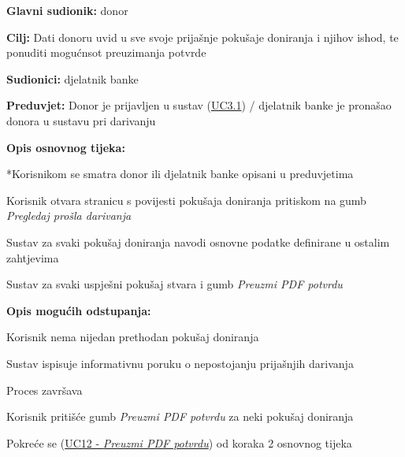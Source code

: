 					
					\noindent {}
					\begin{packed_item} \label{UC11}
	
						\item \textbf{Glavni sudionik: }donor
						\item  \textbf{Cilj:} Dati donoru uvid u sve svoje prijašnje pokušaje doniranja i njihov ishod, te ponuditi mogućnsot preuzimanja potvrde
						\item  \textbf{Sudionici:} djelatnik banke
						\item  \textbf{Preduvjet:} Donor je prijavljen u sustav (\hyperref[UC3.1]{UC3.1}) / djelatnik banke je pronašao donora u sustavu pri darivanju
						\item  \textbf{Opis osnovnog tijeka:}
						
						*Korisnikom se smatra donor ili djelatnik banke opisani u preduvjetima
						\item[] \begin{packed_enum}
							\item Korisnik otvara stranicu s povijesti pokušaja doniranja pritiskom na gumb \textit{Pregledaj prošla darivanja}
	                        \item Sustav za svaki pokušaj doniranja navodi osnovne podatke definirane u ostalim zahtjevima
	                        \item Sustav za svaki uspješni pokušaj stvara i gumb \textit{Preuzmi PDF potvrdu}
						\end{packed_enum}
						
						\item  \textbf{Opis mogućih odstupanja:}
						
						\item[] \begin{packed_item}
	
							\item[2] Korisnik nema nijedan prethodan pokušaj doniranja
							\item[] \begin{packed_enum}
								\item Sustav ispisuje informativnu poruku o nepostojanju prijašnjih darivanja
								\item Proces završava
							\end{packed_enum}
							
							\item[3] Korisnik pritišće gumb \textit{Preuzmi PDF potvrdu} za neki pokušaj doniranja
							\item[] \begin{packed_enum}
							    \item Pokreće se (\hyperref[UC12]{UC12 - \textit{Preuzmi PDF potvrdu}}) od koraka 2 osnovnog tijeka
							\end{packed_enum}

						\end{packed_item}
						
					\end{packed_item}
					
